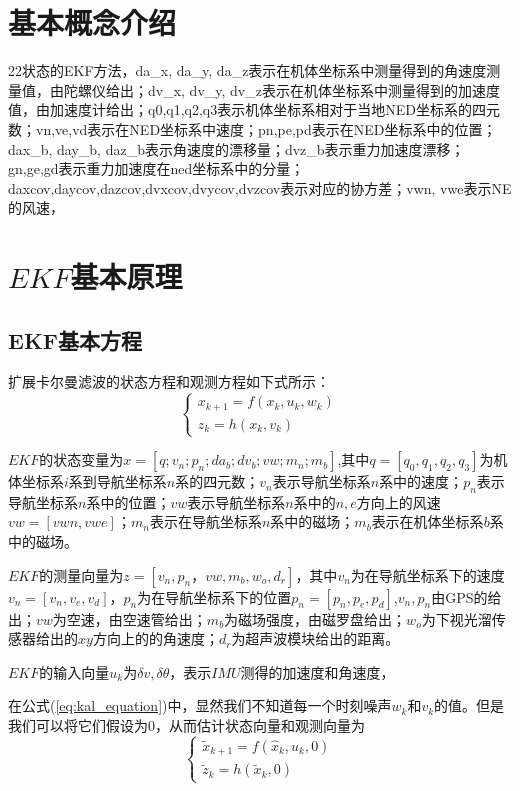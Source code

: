 \documentclass{article}
\begin{document}
\tableofcontents
\newpage 

\section{基本概念介绍}
22状态的EKF方法，da\_x, da\_y, da\_z表示在机体坐标系中测量得到的角速度测量值，由陀螺仪给出；dv\_x, dv\_y, dv\_z表示在机体坐标系中测量得到的加速度值，由加速度计给出；q0,q1,q2,q3表示机体坐标系相对于当地NED坐标系的四元数；vn,ve,vd表示在NED坐标系中速度；pn,pe,pd表示在NED坐标系中的位置；dax\_b, day\_b, daz\_b表示角速度的漂移量；dvz\_b表示重力加速度漂移；gn,ge,gd表示重力加速度在ned坐标系中的分量；daxcov,daycov,dazcov,dvxcov,dvycov,dvzcov表示对应的协方差；vwn, vwe表示NE的风速，

\section{$EKF$基本原理}
\subsection{EKF基本方程}
扩展卡尔曼滤波的状态方程和观测方程如下式所示：
\begin{equation}
\left\{
\begin{array}{l}
	 x_{k+1} = f(x_k, u_k, w_k)  \\
	 z_k = h(x_k, v_k)
\end{array}
\right.
\label{eq:kal_equation}
\end{equation}

$EKF$的状态变量为$x=[q; v_n; p_n; da_b; dv_b; vw; m_n; m_b]$,其中$q=[q_0, q_1, q_2, q_3]$为机体坐标系$i$系到导航坐标系$n$系的四元数；$v_n$表示导航坐标系$n$系中的速度；$p_n$表示导航坐标系$n$系中的位置；$vw$表示导航坐标系$n$系中的$n,e$方向上的风速$vw=[vwn, vwe]$；$m_n$表示在导航坐标系$n$系中的磁场；$m_b$表示在机体坐标系$b$系中的磁场。

$EKF$的测量向量为$z=[v_n, p_n，vw, m_b,w_o, d_r]$，其中$v_n$为在导航坐标系下的速度$v_n=[v_n, v_e, v_d]$，$p_n$为在导航坐标系下的位置$p_n=[p_n, p_e, p_d]$,$v_n, p_n$由GPS的给出；$vw$为空速，由空速管给出；$m_b$为磁场强度，由磁罗盘给出；$w_o$为下视光溜传感器给出的$xy$方向上的的角速度；$d_r$为超声波模块给出的距离。

$EKF$的输入向量$u_k$为$\delta v, \delta \theta $，表示$IMU$测得的加速度和角速度，

在公式(\ref{eq:kal_equation})中，显然我们不知道每一个时刻噪声$w_k$和$v_k$的值。但是我们可以将它们假设为0，从而估计状态向量和观测向量为
\begin{equation}
	\left\{
	\begin{array}{l}
	\tilde{x}_{k+1} = f(\hat{x}_k , u_{k}, 0) \\
	\tilde{z}_k = h(\tilde{x}_k, 0)
	\end{array}
	\right.
	\label{eq:approx_equation}
\end{equation}
\end{document}
